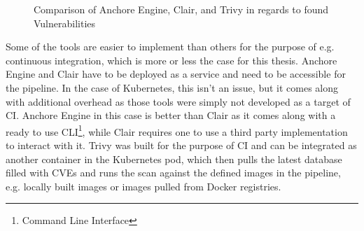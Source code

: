 \begin{figure}[H]
    \centering
    \def\stackalignment{r}
    \caption{Comparison of Anchore Engine, Clair, and Trivy in regards to found Vulnerabilities}
    \label{fig:docker_comparison}
\end{figure}

Some of the tools are easier to implement than others for the purpose of e.g. continuous integration, which is more or less the case for this thesis. Anchore Engine and Clair have to be deployed as a service and need to be accessible for the pipeline. In the case of Kubernetes, this isn't an issue, but it comes along with additional overhead as those tools were simply not developed as a target of CI. Anchore Engine in this case is better than Clair as it comes along with a ready to use CLI\footnote{Command Line Interface}, while Clair requires one to use a third party implementation to interact with it. Trivy was built for the purpose of CI and can be integrated as another container in the Kubernetes pod, which then pulls the latest database filled with CVEs and runs the scan against the defined images in the pipeline, e.g. locally built images or images pulled from Docker registries.

